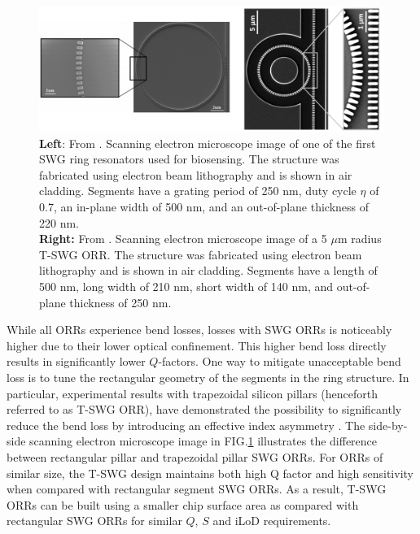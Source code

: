 \documentclass[aps,prl,twocolumn, superscriptaddress,nobalancelastpage]{revtex4}
\begin{document}
\pagebreak
\onecolumngrid

 \begin{figure}[!ht]
    \centering
    \includegraphics[width=15cm]{SWGSEM.png}
    \caption{\textbf{Left}: From \cite{swg3}. Scanning electron microscope image of one of the first SWG ring resonators used for biosensing. The structure was fabricated using electron beam lithography and is shown in air cladding. Segments have a grating period of 250 nm, duty cycle $\eta$ of 0.7,  an in-plane width of 500 nm, and an out-of-plane thickness of 220 nm.  \\ 
    \textbf{Right:} From  \cite{trapezoidal}. Scanning electron microscope image of a 5 $\mu$m radius T-SWG ORR. The structure was fabricated using electron beam lithography and is shown in air cladding. Segments have a length of 500 nm, long width of 210 nm, short width of 140 nm, and out-of-plane thickness of 250 nm.}
    \label{fig:swgSEM}
\end{figure}

\twocolumngrid

While all ORRs experience bend losses, losses with SWG ORRs is noticeably higher due to their lower optical confinement. This higher bend loss directly results in significantly lower $Q$-factors. One way to mitigate unacceptable bend loss is to tune the rectangular geometry of the segments in the ring structure. In particular, experimental results with trapezoidal silicon pillars (henceforth referred to as T-SWG ORR), have demonstrated the possibility to significantly reduce the bend loss by introducing an effective index asymmetry \cite{trapezoidal}. The side-by-side scanning electron microscope image in FIG.\ref{fig:swgSEM} illustrates the difference between rectangular pillar and trapezoidal pillar SWG ORRs. For ORRs of similar size, the T-SWG design maintains both high Q factor and high sensitivity when compared with rectangular segment SWG ORRs. As a result, T-SWG ORRs can be built using a smaller chip surface area as compared with rectangular SWG ORRs for similar $Q$, $S$ and iLoD requirements. 
\end{document}
